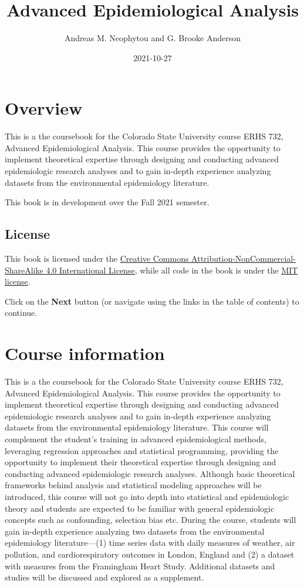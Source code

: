 \documentclass[
]{book}
\title{Advanced Epidemiological Analysis}
\author{Andreas M. Neophytou and G. Brooke Anderson}
\date{2021-10-27}
\begin{document}
\maketitle

{
\setcounter{tocdepth}{1}
\tableofcontents
}
\hypertarget{overview}{%
\chapter{Overview}\label{overview}}

This is a the coursebook for the Colorado State University course ERHS 732,
Advanced Epidemiological Analysis. This course provides the opportunity to
implement theoretical expertise through designing and conducting advanced
epidemiologic research analyses and to gain in-depth experience analyzing
datasets from the environmental epidemiology literature.

This book is in development over the Fall 2021 semester.

\hypertarget{license}{%
\section{License}\label{license}}

This book is licensed under the \href{https://creativecommons.org/licenses/by-nc-sa/4.0/}{Creative Commons
Attribution-NonCommercial-ShareAlike 4.0 International
License}, while all code in
the book is under the \href{https://opensource.org/licenses/MIT}{MIT license}.

Click on the \textbf{Next} button (or navigate using the links in the table of
contents) to continue.

\hypertarget{courseinfo}{%
\chapter{Course information}\label{courseinfo}}

This is a the coursebook for the Colorado State University course ERHS 732,
Advanced Epidemiological Analysis. This course provides the opportunity to
implement theoretical expertise through designing and conducting advanced
epidemiologic research analyses and to gain in-depth experience analyzing
datasets from the environmental epidemiology literature. This course will
complement the student's training in advanced epidemiological methods,
leveraging regression approaches and statistical programming, providing the
opportunity to implement their theoretical expertise through designing and
conducting advanced epidemiologic research analyses. Although basic theoretical frameworks behind analysis and statistical modeling approaches will be introduced, this course will not go into depth into statistical and epidemiologic theory and students are expected to be familiar with general epidemiologic concepts such as confounding, selection bias etc. During the course,
students will gain in-depth experience analyzing two datasets from the
environmental epidemiology literature---(1) time series data with daily measures
of weather, air pollution, and cardiorespiratory outcomes in London, England and
(2) a dataset with measures from the Framingham Heart Study. Additional datasets
and studies will be discussed and explored as a supplement.
\end{document}
